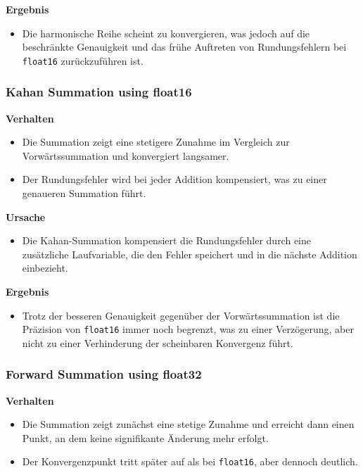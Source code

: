 \documentclass{scrartcl}
\begin{document}
\textbf{Ergebnis}
\begin{itemize}
    \item Die harmonische Reihe scheint zu konvergieren, was jedoch auf die
          beschränkte Genauigkeit und das frühe Auftreten von Rundungsfehlern
          bei \texttt{float16} zurückzuführen ist.
\end{itemize}

\subsubsection{Kahan Summation using float16}

\textbf{Verhalten}
\begin{itemize}
    \item Die Summation zeigt eine stetigere Zunahme im Vergleich zur
          Vorwärtssummation und konvergiert langsamer.
    \item Der Rundungsfehler wird bei jeder Addition kompensiert, was zu einer
          genaueren Summation führt.
\end{itemize}

\textbf{Ursache}
\begin{itemize}
    \item Die Kahan-Summation kompensiert die Rundungsfehler durch eine
          zusätzliche Laufvariable, die den Fehler speichert und in die nächste
          Addition einbezieht.
\end{itemize}

\textbf{Ergebnis}
\begin{itemize}
    \item Trotz der besseren Genauigkeit gegenüber der Vorwärtssummation ist
          die Präzision von \texttt{float16} immer noch begrenzt, was zu einer
          Verzögerung, aber nicht zu einer Verhinderung der scheinbaren
          Konvergenz führt.
\end{itemize}

\subsubsection{Forward Summation using float32}

\textbf{Verhalten}
\begin{itemize}
    \item Die Summation zeigt zunächst eine stetige Zunahme und erreicht dann
          einen Punkt, an dem keine signifikante Änderung mehr erfolgt.
    \item Der Konvergenzpunkt tritt später auf als bei \texttt{float16}, aber
          dennoch deutlich.
\end{itemize}
\end{document}
